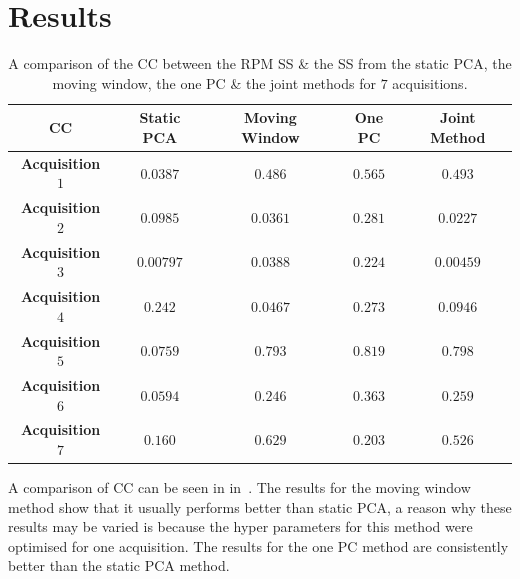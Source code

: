 \section{Results} \label{sec:results}
    \begin{table}
        \vspace{-0.5cm}
        \centering
        \captionsetup{singlelinecheck=false, justification=centering}
        \caption{A comparison of the \gls{CC} between the \gls{RPM} \gls{SS} \& the \gls{SS} from the static \gls{PCA}, the moving window, the one \gls{PC} \& the joint methods for $7$ acquisitions.}
        
        \resizebox*{0.75\linewidth}{!}
        {
            \begin{tabular}{||c|cccc||}
                \hline
                \textbf{\gls{CC}} & \textbf{Static \gls{PCA}} & \textbf{Moving Window} & \textbf{One \gls{PC}} & \textbf{Joint Method} \\
                \hline
                \textbf{Acquisition $1$}   & $0.0387$  & $0.486$  & $0.565$  & $0.493$   \\
                \textbf{Acquisition $2$}   & $0.0985$  & $0.0361$ & $0.281$  & $0.0227$  \\
                \textbf{Acquisition $3$}   & $0.00797$ & $0.0388$ & $0.224$  & $0.00459$ \\
                \textbf{Acquisition $4$}   & $0.242$   & $0.0467$ & $0.273$  & $0.0946$  \\
                \textbf{Acquisition $5$}   & $0.0759$  & $0.793$  & $0.819$  & $0.798$   \\
                \textbf{Acquisition $6$}   & $0.0594$  & $0.246$  & $0.363$  & $0.259$   \\
                \textbf{Acquisition $7$}   & $0.160$   & $0.629$  & $0.203$  & $0.526$   \\
                \hline
            \end{tabular}
        }
        \label{tab:cross_correlation}
        \vspace{-0.5cm}
    \end{table}
    
    A comparison of \gls{CC} can be seen in in~. The results for the moving window method show that it usually performs better than static \gls{PCA}, a reason why these results may be varied is because the hyper parameters for this method were optimised for one acquisition. The results for the one \gls{PC} method are consistently better than the static \gls{PCA} method.
    
